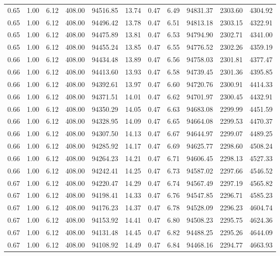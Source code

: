 \begin{table}[!ht]
\begin{tabular}{rrrrrrrrrrr}
0.65 & 1.00 & 6.12 & 408.00 & 94516.85 & 13.74 & 0.47 & 6.49 & 94831.37 & 2303.60 & 4304.92 \\
0.65 & 1.00 & 6.12 & 408.00 & 94496.42 & 13.78 & 0.47 & 6.51 & 94813.18 & 2303.15 & 4322.91 \\
0.65 & 1.00 & 6.12 & 408.00 & 94475.89 & 13.81 & 0.47 & 6.53 & 94794.90 & 2302.71 & 4341.00 \\
0.65 & 1.00 & 6.12 & 408.00 & 94455.24 & 13.85 & 0.47 & 6.55 & 94776.52 & 2302.26 & 4359.19 \\
0.66 & 1.00 & 6.12 & 408.00 & 94434.48 & 13.89 & 0.47 & 6.56 & 94758.03 & 2301.81 & 4377.47 \\
0.66 & 1.00 & 6.12 & 408.00 & 94413.60 & 13.93 & 0.47 & 6.58 & 94739.45 & 2301.36 & 4395.85 \\
0.66 & 1.00 & 6.12 & 408.00 & 94392.61 & 13.97 & 0.47 & 6.60 & 94720.76 & 2300.91 & 4414.33 \\
0.66 & 1.00 & 6.12 & 408.00 & 94371.51 & 14.01 & 0.47 & 6.62 & 94701.97 & 2300.45 & 4432.91 \\
0.66 & 1.00 & 6.12 & 408.00 & 94350.29 & 14.05 & 0.47 & 6.63 & 94683.08 & 2299.99 & 4451.59 \\
0.66 & 1.00 & 6.12 & 408.00 & 94328.95 & 14.09 & 0.47 & 6.65 & 94664.08 & 2299.53 & 4470.37 \\
0.66 & 1.00 & 6.12 & 408.00 & 94307.50 & 14.13 & 0.47 & 6.67 & 94644.97 & 2299.07 & 4489.25 \\
0.66 & 1.00 & 6.12 & 408.00 & 94285.92 & 14.17 & 0.47 & 6.69 & 94625.77 & 2298.60 & 4508.24 \\
0.66 & 1.00 & 6.12 & 408.00 & 94264.23 & 14.21 & 0.47 & 6.71 & 94606.45 & 2298.13 & 4527.33 \\
0.66 & 1.00 & 6.12 & 408.00 & 94242.41 & 14.25 & 0.47 & 6.73 & 94587.02 & 2297.66 & 4546.52 \\
0.67 & 1.00 & 6.12 & 408.00 & 94220.47 & 14.29 & 0.47 & 6.74 & 94567.49 & 2297.19 & 4565.82 \\
0.67 & 1.00 & 6.12 & 408.00 & 94198.41 & 14.33 & 0.47 & 6.76 & 94547.85 & 2296.71 & 4585.23 \\
0.67 & 1.00 & 6.12 & 408.00 & 94176.23 & 14.37 & 0.47 & 6.78 & 94528.09 & 2296.23 & 4604.74 \\
0.67 & 1.00 & 6.12 & 408.00 & 94153.92 & 14.41 & 0.47 & 6.80 & 94508.23 & 2295.75 & 4624.36 \\
0.67 & 1.00 & 6.12 & 408.00 & 94131.48 & 14.45 & 0.47 & 6.82 & 94488.25 & 2295.26 & 4644.09 \\
0.67 & 1.00 & 6.12 & 408.00 & 94108.92 & 14.49 & 0.47 & 6.84 & 94468.16 & 2294.77 & 4663.93 \\

\end{tabular}
\end{table}
